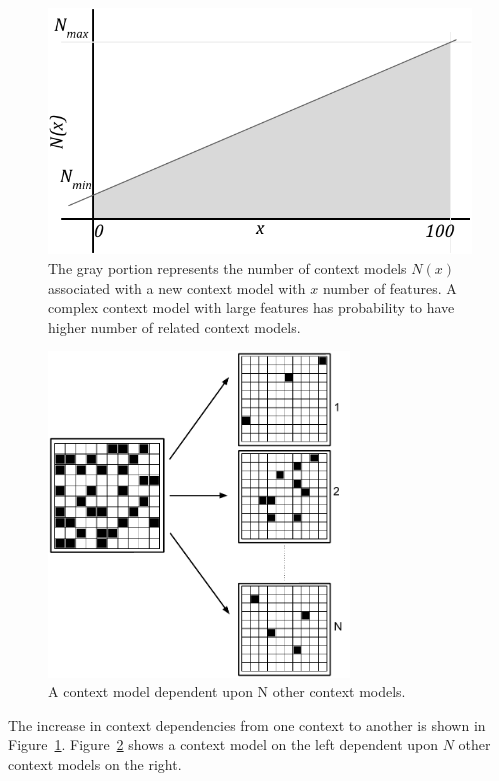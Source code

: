 \begin{figure}[!htb]
  \centering
  \includegraphics[width=12cm]{figures/num-of-context-models-vs-features.pdf}
  \caption{The gray portion represents the number of context models $N(x)$ associated with a new context model with $x$ number of features. A complex context model with large features has probability to have higher number of related context models.}
  \label{fig:num-of-context-models-vs-features}
\end{figure}

\begin{figure}[!htb]
  \centering
  \includegraphics[width=8cm]{figures/context-model-dependency.pdf}
  \caption{A context model dependent upon N other context models.}
  \label{fig:context-model-dependency}
\end{figure}

The increase in context dependencies from one context to another is shown in Figure~\ref{fig:num-of-context-models-vs-features}. Figure~\ref{fig:context-model-dependency} shows a context model on the left dependent upon $N$ other context models on the right.

